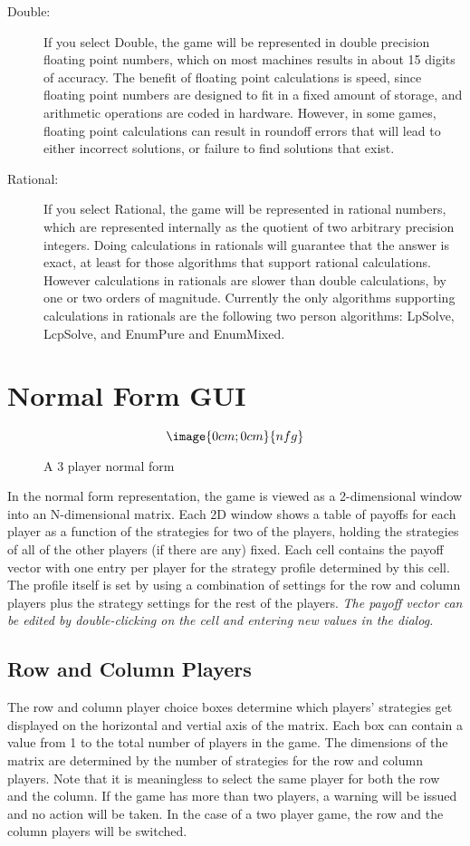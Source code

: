 \begin{description}
\item[Double:]  If you select Double, the game will be represented in double precision floating
 point numbers, which on most machines results in about 15 digits of accuracy.  The benefit of 
floating point calculations is speed, since floating point numbers are designed to fit in a fixed 
amount of storage, and arithmetic operations are coded in hardware.  However,  in some games, 
floating point calculations can result in roundoff errors that will lead to either incorrect 
solutions, or failure to find solutions that exist.  
\item[Rational:]  If you select Rational, the game will be represented in rational numbers, 
which are represented internally as the quotient of two arbitrary precision integers.  Doing 
calculations in rationals will guarantee that the answer is exact, at least for those algorithms 
that support rational calculations.  However calculations in rationals are slower than double 
calculations, by one or two orders of magnitude.  Currently the only algorithms supporting 
calculations in rationals are the following two person algorithms: LpSolve, LcpSolve, and 
EnumPure and EnumMixed.  
\end{description}

\section{Normal Form GUI}

\begin{figure}
$$\image{0cm;0cm}{nfg}$$
\caption{A 3 player normal form}\label{fig_nfg}
\end{figure}

In the normal form representation, the game is viewed as a 2-dimensional
window into an N-dimensional matrix.  Each 2D window shows a table of
payoffs for each player as a function of the strategies for two of the
players, holding the strategies of all of the other players (if there are
any) fixed.  Each cell contains the payoff vector with one entry per
player for the strategy profile determined by this cell.  The profile
itself is set by using a combination of settings for the row and column
players plus the strategy settings for the rest of the players.  {\em The
payoff vector can be edited by double-clicking on the cell and entering
new values in the dialog.}

\subsection{Row and Column Players} The row and column player choice boxes
determine which players' strategies get displayed on the horizontal and
vertial axis of the matrix.  Each box can contain a value from 1 to the
total number of players in the game.  The dimensions of the matrix are
determined by the number of strategies for the row and column players.
Note that it is meaningless to select the same player for both the row and
the column.  If the game has more than two players, a warning will be
issued and no action will be taken.  In the case of a two player game, the
row and the column players will be switched.

